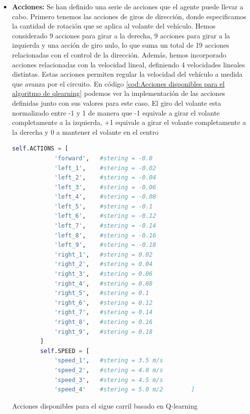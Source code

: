 \begin{itemize}
    \item \textbf{Acciones:} Se han definido una serie de acciones que el agente puede llevar a cabo. Primero tenemos las acciones de giros de dirección, donde especificamos la cantidad de rotación que se aplica al volante del vehículo. Hemos considerado 9 acciones para girar a la derecha, 9 acciones para girar a la izquierda y una acción de giro nulo, lo que suma un total de 19 acciones relacionadas con el control de la dirección. Además, hemos incorporado acciones relacionadas con la velocidad lineal, definiendo 4 velocidades lineales distintas. Estas acciones permiten regular la velocidad del vehículo a medida que avanza por el circuito. En código \ref{cod:Acciones disponibles para el algoritmo de qlearning} podemos ver la implementación de las acciones definidas junto con sus valores para este caso. El giro del volante esta normalizado entre -1 y 1 de manera que -1 equivale a girar el volante completamente a la izquierda, +1 equivale a girar el volante completamente a la derecha y 0 a mantener el volante en el centro
    \bigskip
    \begin{code}[H]
	\begin{lstlisting}[language=Python]
        self.ACTIONS = [ 
            'forward',   #stering = -0.0
            'left_1',    #stering = -0.02     
            'left_2',    #stering = -0.04
            'left_3',    #stering = -0.06
            'left_4',    #stering = -0.08
            'left_5',    #stering = -0.1
            'left_6',    #stering = -0.12
            'left_7',    #stering = -0.14
            'left_8',    #stering = -0.16  
            'left_9',    #stering = -0.18 
            'right_1',   #stering = 0.02  
            'right_2',   #stering = 0.04
            'right_3',   #stering = 0.06  
            'right_4',   #stering = 0.08     
            'right_5',   #stering = 0.1 
            'right_6',   #stering = 0.12 
            'right_7',   #stering = 0.14 
            'right_8',   #stering = 0.16 
            'right_9',   #stering = 0.18
        ]
        self.SPEED = [ 
            'speed_1',   #stering = 3.5 m/s  
            'speed_2',   #stering = 4.0 m/s  
            'speed_3',   #stering = 4.5 m/s
            'speed_4'    #stering = 5.0 m/2        ]
	\end{lstlisting}
\caption[Acciones disponibles para el sigue carril basado en Q-learning]{Acciones disponibles para el sigue carril basado en Q-learning}
\label{cod:Acciones disponibles para el algoritmo de qlearning}
\end{code}
    

\end{itemize}
